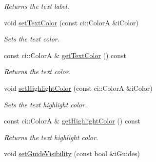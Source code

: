 \begin{DoxyCompactItemize}
\begin{DoxyCompactList}\small\item\em Returns the text label. \end{DoxyCompactList}\item 
\hypertarget{class_gui_text_a9d48eb65fe6f5c3d022e40fba48b3898}{void \hyperlink{class_gui_text_a9d48eb65fe6f5c3d022e40fba48b3898}{set\-Text\-Color} (const ci\-::\-Color\-A \&i\-Color)}\label{class_gui_text_a9d48eb65fe6f5c3d022e40fba48b3898}

\begin{DoxyCompactList}\small\item\em Sets the text color. \end{DoxyCompactList}\item 
\hypertarget{class_gui_text_ac0701398fe08316be9e4b76248a9daf6}{const ci\-::\-Color\-A \& \hyperlink{class_gui_text_ac0701398fe08316be9e4b76248a9daf6}{get\-Text\-Color} () const }\label{class_gui_text_ac0701398fe08316be9e4b76248a9daf6}

\begin{DoxyCompactList}\small\item\em Returns the text color. \end{DoxyCompactList}\item 
\hypertarget{class_gui_text_a9ac5c71c03e77a9b1e074c2a5d0e4a6f}{void \hyperlink{class_gui_text_a9ac5c71c03e77a9b1e074c2a5d0e4a6f}{set\-Highlight\-Color} (const ci\-::\-Color\-A \&i\-Color)}\label{class_gui_text_a9ac5c71c03e77a9b1e074c2a5d0e4a6f}

\begin{DoxyCompactList}\small\item\em Sets the text highlight color. \end{DoxyCompactList}\item 
\hypertarget{class_gui_text_a3d07998b718c8dfccedb11b6bd449161}{const ci\-::\-Color\-A \& \hyperlink{class_gui_text_a3d07998b718c8dfccedb11b6bd449161}{get\-Highlight\-Color} () const }\label{class_gui_text_a3d07998b718c8dfccedb11b6bd449161}

\begin{DoxyCompactList}\small\item\em Returns the text highlight color. \end{DoxyCompactList}\item 
\hypertarget{class_gui_text_a3f696f0ea57bd16cae0f4c398720b7b5}{void \hyperlink{class_gui_text_a3f696f0ea57bd16cae0f4c398720b7b5}{set\-Guide\-Visibility} (const bool \&i\-Guides)}\label{class_gui_text_a3f696f0ea57bd16cae0f4c398720b7b5}


\end{DoxyCompactItemize}
